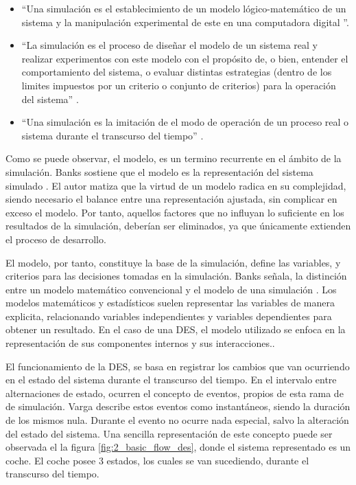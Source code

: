 \begin{itemize}
	\item ``Una simulación es
	el establecimiento de un modelo lógico-matemático de un sistema
	y la manipulación experimental de este en una computadora digital
	\citep{pritsker1974gasp}''.   
	\item ``La simulación es el proceso de diseñar
		el modelo de un sistema real y realizar experimentos
		con este modelo con el propósito de,
		o bien,
		entender el comportamiento del sistema,
		o evaluar distintas estrategias
		(dentro de los limites impuestos por un criterio
		o conjunto de criterios)
		para la operación del sistema'' \citep{shannon1976systems}.
	\item ``Una simulación es la imitación de el modo de operación
		de un proceso real o sistema durante el transcurso del tiempo''
		\citep{banks1999introduction}.
\end{itemize}

Como se puede observar, el modelo,
es un termino recurrente en el ámbito de la simulación.
Banks sostiene que el modelo es la representación del sistema simulado
\citep{banks1998handbook}.
El autor matiza que la virtud de un modelo radica en su complejidad,
siendo necesario el balance entre una representación ajustada,
sin complicar en exceso el modelo.
Por tanto, aquellos factores que no influyan lo suficiente
en los resultados de la simulación, deberían ser eliminados,
ya que únicamente extienden el proceso de desarrollo.

El modelo, por tanto, constituye la base de la simulación,
define las variables, y criterios para las decisiones tomadas en la simulación.
Banks señala, la distinción entre un modelo matemático convencional
y el modelo de una simulación \citep{banks1998handbook}.
Los modelos matemáticos y estadísticos
suelen representar las variables de manera explicita,
relacionando variables independientes y variables dependientes
para obtener un resultado.
En el caso de una DES, el modelo utilizado se enfoca en
la representación de sus componentes internos y sus interacciones..

El funcionamiento de la DES, se basa en registrar los cambios
que van ocurriendo en el estado del sistema durante el transcurso del tiempo.
En el intervalo entre alternaciones de estado,
ocurren el concepto de eventos, propios de esta rama de de simulación.
Varga \citep{varga2001discrete} describe estos eventos como instantáneos,
siendo la duración de los mismos nula.
Durante el evento no ocurre nada especial,
salvo la alteración del estado del sistema.
Una sencilla representación de este concepto
puede ser observada el la figura \ref{fig:2_basic_flow_des},
donde el sistema representado es un coche.
El coche posee 3 estados, los cuales se van sucediendo,
durante el transcurso del tiempo.

